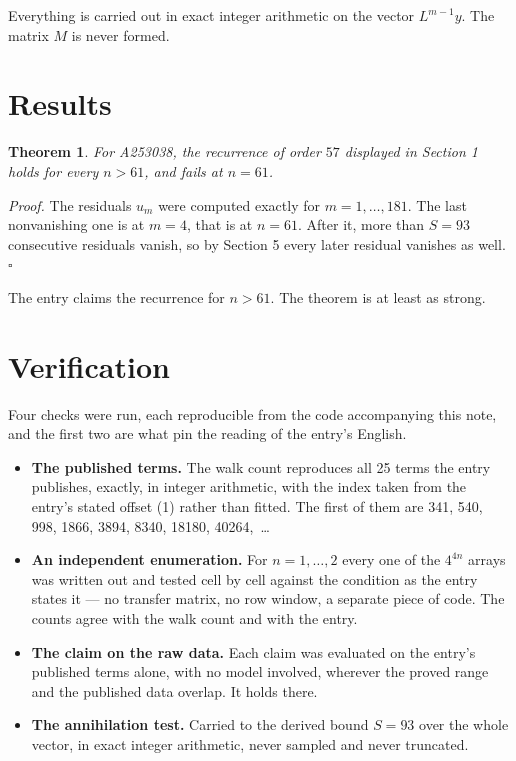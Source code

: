 \documentclass[11pt]{article}
\newtheorem{theorem}{Theorem}
\theoremstyle{definition}
\begin{document}
Everything is carried out in exact integer arithmetic on the vector $L^{m-1}y$. The matrix $M$ is never formed.

\section{Results}

\begin{theorem} For A253038, the recurrence of order $57$ displayed in Section 1 holds for every $n > 61$, and fails at $n = 61$.\end{theorem}

{\itshape Proof.} The residuals $u_m$ were computed exactly for $m = 1,\dots,181$. The last nonvanishing one is at $m = 4$, that is at $n = 61$. After it, more than $S = 93$ consecutive residuals vanish, so by Section 5 every later residual vanishes as well. $\square$

The entry claims the recurrence for $n > 61$. The theorem is at least as strong.

\section{Verification}

Four checks were run, each reproducible from the code accompanying this note, and the first two are what pin the reading of the entry's English.

\begin{itemize}

\item {\bfseries The published terms.} The walk count reproduces all 25 terms the entry publishes, exactly, in integer arithmetic, with the index taken from the entry's stated offset (1) rather than fitted. The first of them are 341, 540, 998, 1866, 3894, 8340, 18180, 40264,~\dots

\item {\bfseries An independent enumeration.} For $n = 1,\dots,2$ every one of the $4^{4n}$ arrays was written out and tested cell by cell against the condition as the entry states it --- no transfer matrix, no row window, a separate piece of code. The counts agree with the walk count and with the entry.

\item {\bfseries The claim on the raw data.} Each claim was evaluated on the entry's published terms alone, with no model involved, wherever the proved range and the published data overlap. It holds there.

\item {\bfseries The annihilation test.} Carried to the derived bound $S = 93$ over the whole vector, in exact integer arithmetic, never sampled and never truncated.

\end{itemize}
\end{document}
